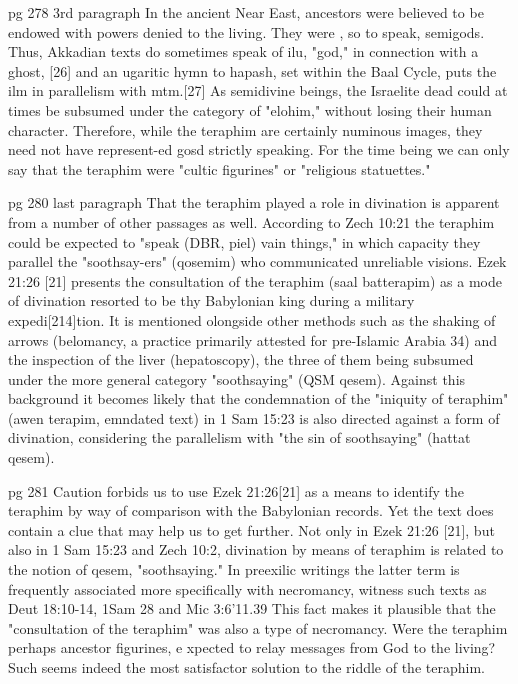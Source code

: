 \documentclass[11pt]{article}
\begin{document}
{pg 278 3rd paragraph
In the ancient Near East, ancestors were believed to be endowed with powers denied to the living. They were , so to speak, semigods. Thus, Akkadian texts do sometimes speak of ilu, "god," in connection with a ghost, [26] and an ugaritic hymn to hapash, set within the Baal Cycle, puts the ilm in parallelism with mtm.[27] As semidivine beings, the Israelite dead could at times be subsumed under the category of "elohim," without losing their human character. Therefore, while the teraphim are certainly numinous images, they need not have represent-ed gosd strictly speaking. For the time being we can only say that the teraphim were "cultic figurines" or "religious statuettes."

pg 280 last paragraph
That the teraphim played a role in divination is apparent from a number of other passages as well. According to Zech 10:21 the teraphim could be expected to "speak (DBR, piel) vain things," in which capacity they parallel the "soothsay-ers" (qosemim) who communicated unreliable visions. Ezek 21:26 [21] presents the consultation of the teraphim (saal batterapim) as a mode of divination resorted to be thy Babylonian king during a military expedi[214]tion. It is mentioned olongside other methods such as the shaking of arrows (belomancy, a practice primarily attested for pre-Islamic Arabia 34) and the inspection of the liver (hepatoscopy), the three of them being subsumed under the more general category "soothsaying" (QSM qesem). Against this background it becomes likely that the condemnation of the "iniquity of teraphim" (awen terapim, emndated text) in 1 Sam 15:23 is also directed against a form of divination, considering the parallelism with "the sin of soothsaying" (hattat qesem).

pg 281 Caution forbids us to use Ezek 21:26[21] as a means to identify the teraphim by way of comparison with the Babylonian records. Yet the text does contain a clue that may help us to get further. Not only in Ezek 21:26 [21], but also in 1 Sam 15:23 and Zech 10:2, divination by means of teraphim is related to the notion of qesem, "soothsaying." In preexilic writings the latter term is frequently associated more specifically with necromancy, witness such texts as Deut 18:10-14, 1Sam 28 and Mic 3:6'11.39 This fact makes it plausible that the "consultation of the teraphim" was also a type of necromancy. Were the teraphim perhaps ancestor figurines, e xpected to relay messages from God to the living?
Such seems indeed the most satisfactor solution to the riddle of the teraphim.

}
\end{document}
